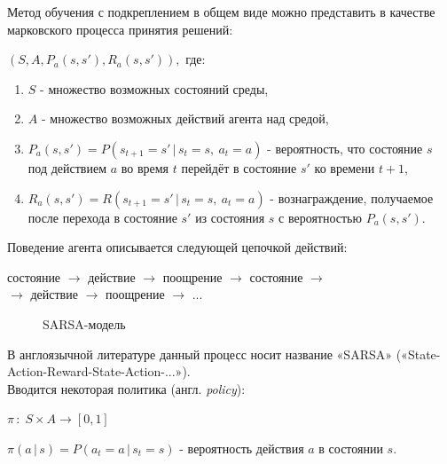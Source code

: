 \documentclass[12pt, a4paper]{report}
\theoremstyle{definition}
\theoremstyle{plain}
\theoremstyle{remark}
\theoremstyle{remark}
\theoremstyle{definition}
\begin{document}
Метод обучения с подкреплением в общем виде можно представить в качестве марковского процесса принятия решений:
\begin{center}
	 $ (S, A, P_a(s, s'), R_a(s, s')),$ где:
\end{center}
\begin{enumerate}
 	\item $S$ - множество возможных состояний среды,
 	\item $A$ - множество возможных действий агента над средой,
 	\item $P_a(s, s') = P(s_{t+1}=s'\,|\,s_t=s,\:a_t=a)$ - вероятность, что состояние $s$ под действием $a$ во время $t$ перейдёт в состояние $s'$ ко времени $t+1$,
 	\item $R_a(s, s') = R(s_{t+1}=s'\,|\,s_t=s,\:a_t=a)$ - вознаграждение, получаемое после перехода в состояние $s'$ из состояния $s$ с вероятностью $P_a(s,s')$.
\end{enumerate}


Поведение агента описывается следующей цепочкой действий:
\begin{center}
состояние $\rightarrow$ действие
$\rightarrow$ поощрение $\rightarrow$ состояние $\rightarrow$ \\
$\rightarrow$ действие $\rightarrow$ поощрение $\rightarrow$ ... 
\end{center}

\begin{figure}[h!]
	\caption{SARSA-модель}
\end{figure}

В англоязычной литературе данный процесс носит название «SARSA» («State-Action-Reward-State-Action-...»).\\

Вводится некоторая политика (англ. \textit{policy}):
\begin{center}
	$\pi \, : \; S \times A \rightarrow [0, 1]$

$\pi(a\,|\,s) = P(a_t=a\,|\,s_t=s)$ - вероятность действия $a$ в состоянии $s$.
\end{center}
\end{document}
